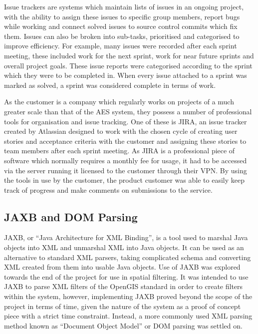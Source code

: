 \documentclass[a4paper, 12pt, twoside]{article}
\begin{document}
Issue trackers are systems which maintain lists of issues in an ongoing project, with the ability to assign these issues to specific group members, report bugs while working and connect solved issues to source control commits which fix them. Issues can also be broken into sub-tasks, prioritised and categorised to improve efficiency. For example, many issues were recorded after each sprint meeting, these included work for the next sprint, work for near future sprints and overall project goals. These issue reports were categorised according to the sprint which they were to be completed in. When every issue attached to a sprint was marked as solved, a sprint was considered complete in terms of work.

As the customer is a company which regularly works on projects of a much greater scale than that of the AES system, they possess a number of professional tools for organisation and issue tracking. One of these is JIRA, an issue tracker created by Atlassian designed to work with the chosen cycle of creating user stories and acceptance criteria with the customer and assigning these stories to team members after each sprint meeting. As JIRA is a professional piece of software which normally requires a monthly fee for usage, it had to be accessed via the server running it licensed to the customer through their VPN. By using the tools in use by the customer, the product customer was able to easily keep track of progress and make comments on submissions to the service.

\subsection{JAXB and DOM Parsing}
\label{sec:bg_parsing}

JAXB, or ``Java Architecture for XML Binding'', is a tool used to marshal Java objects into XML and unmarshal XML into Java objects. It can be used as an alternative to standard XML parsers, taking complicated schema and converting XML created from them into usable Java objects\cite{ort2003java}. Use of JAXB was explored towards the end of the project for use in spatial filtering. It was intended to use JAXB to parse XML filters of the OpenGIS standard in order to create filters within the system, however, implementing JAXB proved beyond the scope of the project in terms of time, given the nature of the system as a proof of concept piece with a strict time constraint. Instead, a more commonly used XML parsing method known as ``Document Object Model'' or DOM parsing was settled on.
\end{document}
